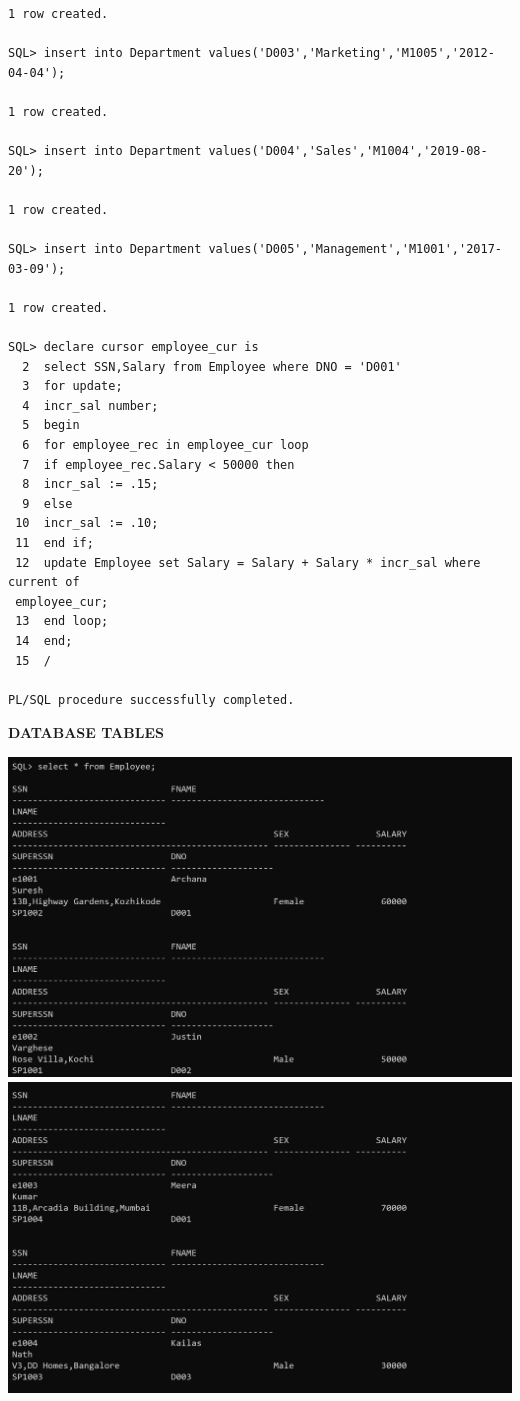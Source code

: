 \documentclass[a4paper,12pt]{report}
\begin{document}
\begin{verbatim}
1 row created.

SQL> insert into Department values('D003','Marketing','M1005','2012-04-04');

1 row created.

SQL> insert into Department values('D004','Sales','M1004','2019-08-20');

1 row created.

SQL> insert into Department values('D005','Management','M1001','2017-03-09');

1 row created.

SQL> declare cursor employee_cur is
  2  select SSN,Salary from Employee where DNO = 'D001'
  3  for update;
  4  incr_sal number;
  5  begin
  6  for employee_rec in employee_cur loop
  7  if employee_rec.Salary < 50000 then
  8  incr_sal := .15;
  9  else
 10  incr_sal := .10;
 11  end if;
 12  update Employee set Salary = Salary + Salary * incr_sal where current of
 employee_cur;
 13  end loop;
 14  end;
 15  /

PL/SQL procedure successfully completed.

\end{verbatim}
\begin{flushleft}
\textbf{DATABASE TABLES}
\end{flushleft}
\includegraphics[scale=0.2]{C1_emp_1.png}
\includegraphics[scale=0.2]{C1_emp_2.png}
\end{document}
